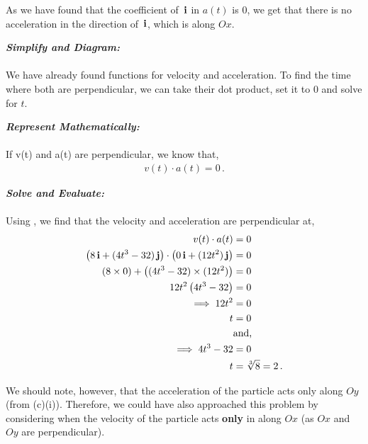 \begin{subquestions}
\begin{subsubquestions}
As we have found that the coefficient of $\,\mathbf{i}$ in $a(t)$ is 0, we get that there is no acceleration in the direction of $\,\mathbf{i}$, which is along $Ox$. 


\subsubquestion

\textbf{\textit{Simplify and Diagram:}} \\ \\
We have already found functions for velocity and acceleration. To find the time where both are perpendicular, we can take their dot product, set it to 0 and solve for $t$.




\textbf{\textit{Represent Mathematically:}} \\ \\
If v(t) and a(t) are perpendicular, we know that,
\begin{align}
	v(t) \cdot a(t) = 0 \label{2009:q6:DotEqn} \,.
\end{align}




\textbf{\textit{Solve and Evaluate:}} \\ \\
Using , we find that the velocity and acceleration are perpendicular at,
\begin{align}
	v(t) \cdot a(t) & = 0 \nonumber \\
	\left(8\,\mathbf{i} + (4t^3-32)\,\mathbf{j}\right) \cdot \left(0\,\mathbf{i} + (12t^2)\,\mathbf{j} \right) & = 0 \nonumber \\
	\left(8 \times 0\right) + \left((4t^3-32) \times (12t^2)\right) & = 0 \nonumber \\
	12t^2\left(4t^3-32\right) & = 0 \nonumber \\
	\implies 12t^2 & = 0 \nonumber \\
	t & = 0 \\
	& \text{and,} \nonumber \\
	\implies 4t^3-32 & = 0 \nonumber \\
	t & = \sqrt[3]{8} = 2 \,.
\end{align}

We should note, however, that the acceleration of the particle acts only along $Oy$ (from (c)(i)). Therefore, we could have also approached this problem by considering when the velocity of the particle acts \textbf{only} in along $Ox$ (as $Ox$ and $Oy$ are perpendicular).



\end{subsubquestions}
\end{subquestions}
